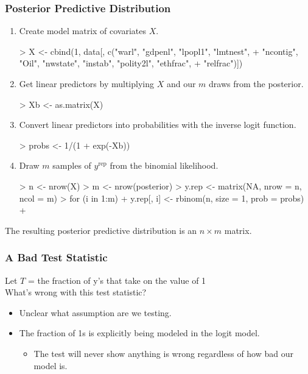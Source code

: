 \documentclass[handout]{beamer}
\begin{document}
\begin{frame}[fragile]
\frametitle{Posterior Predictive Distribution}
\pause
\begin{enumerate}
\item Create model matrix of covariates $X$.
\tiny 
\medskip
\pause
\begin{Schunk}
\begin{Sinput}
> X <- cbind(1, data[, c("warl", "gdpenl", "lpopl1", "lmtnest", 
+     "ncontig", "Oil", "nwstate", "instab", "polity2l", "ethfrac", 
+     "relfrac")])
\end{Sinput}
\end{Schunk}
\pause
\normalsize
\medskip
\item Get linear predictors by multiplying $X$ and our $m$ draws from
the posterior.
\tiny 
\medskip
\pause
\begin{Schunk}
\begin{Sinput}
> Xb <- as.matrix(X) %
\end{Sinput}
\end{Schunk}
\pause
\normalsize
\medskip
\item Convert linear predictors into probabilities with the inverse logit function.
\tiny 
\medskip
\pause
\begin{Schunk}
\begin{Sinput}
> probs <- 1/(1 + exp(-Xb))
\end{Sinput}
\end{Schunk}
\pause
\normalsize
\medskip
\item Draw $m$ samples of $y^{\mathrm{rep}}$ from the binomial likelihood.
\tiny 
\medskip
\pause
\begin{Schunk}
\begin{Sinput}
> n <- nrow(X)
> m <- nrow(posterior)
> y.rep <- matrix(NA, nrow = n, ncol = m)
> for (i in 1:m) {
+     y.rep[, i] <- rbinom(n, size = 1, prob = probs)
+ }
\end{Sinput}
\end{Schunk}
\pause
\normalsize
\end{enumerate}
The resulting posterior predictive distribution is an $n \times m$
matrix.
\end{frame}

\begin{frame}
\frametitle{A Bad Test Statistic}
\pause
Let $T$ = the fraction of y's that take on the value of 1 \\
\bigskip
\pause
What's wrong with this test statistic?
\pause
\medskip
\begin{itemize}
\item Unclear what assumption are we testing.
\pause
\item The fraction of 1s is explicitly being modeled in the logit model.
\pause
\begin{itemize}
\item The test will never show anything is wrong regardless of how bad
our model is.
\end{itemize}
\end{itemize}
\end{frame}
\end{document}
